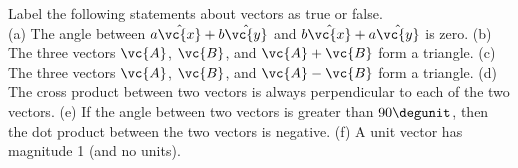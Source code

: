 Label the following statements about vectors as true or false.\\
%
(a) The angle between $a \hat{\vc{x}} + b \hat{\vc{y}}$ and $b \hat{\vc{x}} + a \hat{\vc{y}}$ is
zero.\hwendpart
%
(b) The three vectors $\vc{A}$, $\vc{B}$, and $\vc{A}+\vc{B}$ form a
triangle.\hwendpart
%
(c) The three vectors $\vc{A}$, $\vc{B}$, and $\vc{A}-\vc{B}$ form a
triangle.\hwendpart
%
(d) The cross product between two vectors is always perpendicular to
each of the two vectors.\hwendpart
%
(e) If the angle between two vectors is greater than $90\degunit$,
then the dot product between the two vectors is negative.\hwendpart
%
(f) A unit vector has magnitude 1 (and no units).
